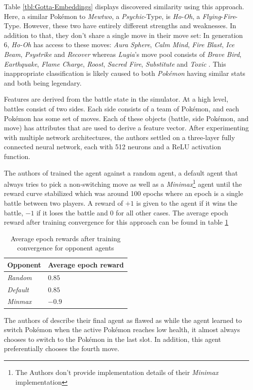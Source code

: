 Table \ref{tbl:Gotta-Embeddings} displays discovered similarity using this approach. Here, a similar Pokémon
to \textit{Mewtwo}, a \textit{Psychic}-Type, is \textit{Ho-Oh}, a \textit{Flying}-\textit{Fire}-Type. However,
these two have entirely different strengths and weaknesses. In addition to that, they don't share a single
move in their move set: 
In generation 6, \textit{Ho-Oh} has access to these moves: \textit{Aura Sphere}, \textit{Calm Mind}, 
\textit{Fire Blast}, \textit{Ice Beam}, \textit{Psystrike} and \textit{Recover} whereas \textit{Lugia}'s
move pool consists of \textit{Brave Bird}, \textit{Earthquake}, \textit{Flame Charge}, \textit{Roost},
\textit{Sacred Fire}, \textit{Substitute} and \textit{Toxic} \cite{DamageCalc:Gen6}. This inappropriate
classification is likely caused to both \textit{Pokémon} having similar stats and both being legendary.

Features are derived from the battle state in the simulator. At a high level, battles consist of two
sides. Each side consists of a team of Pokémon, and each Pokémon has some set of moves. Each of these 
objects (battle, side Pokémon, and move) has attributes that are used to derive a feature vector.
After experimenting with multiple network architectures, the authors settled on a three-layer 
fully connected neural network, each with 512 neurons and a ReLU activation function.

The authors of \cite{GottaTrainEmAll} trained the agent against a random agent, a default agent 
that always tries to pick a non-switching move as well as a \emph{Minimax}\footnote{The Authors don't
provide implementation details of their \emph{Minimax} implementation} agent
until the reward curve stabilized which was around 100 epochs where an epoch is a single battle between
two players. A reward of $+1$ is given to the agent if it wins the battle, $-1$ if it loses the battle and
$0$ for all other cases. The average epoch reward after training convergence for this approach can
be found in table \ref{tbl:Gotta-Performance}
\begin{table}[h]
    \centering
        \begin{tabular}{|l|l|}
            \hline
            Opponent & Average epoch reward \\
            \hline
            \emph{Random} & $0.85$ \\
            \hline
            \emph{Default} & $0.85$ \\
            \hline
            \emph{Minmax} & $-0.9$ \\
            \hline
        \end{tabular}
        \caption{Average epoch rewards after training convergence for opponent agents \cite{GottaTrainEmAll}}
        \label{tbl:Gotta-Performance}
\end{table}
The authors of \cite{GottaTrainEmAll} describe their final agent as flawed as while the agent learned 
to switch Pokémon when the active Pokémon reaches low health, it almost always chooses to switch to the
Pokémon in the last slot. In addition, this agent preferentially chooses the fourth move. 

